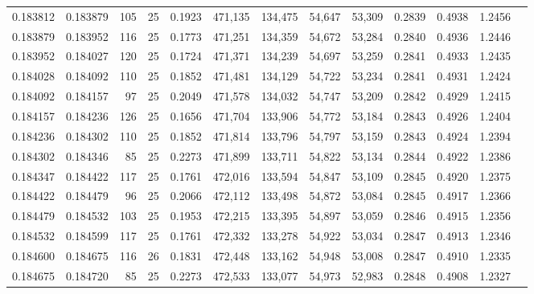 \begin{tabular}{rrrrrrrrrrrrr}
0.183812 & 0.183879 &   105 &  25 &                                     0.1923 & 471,135 & 134,475 &  54,647 &  53,309 & 0.2839 & 0.4938 & 1.2456 \\
0.183879 & 0.183952 &   116 &  25 &                                     0.1773 & 471,251 & 134,359 &  54,672 &  53,284 & 0.2840 & 0.4936 & 1.2446 \\
0.183952 & 0.184027 &   120 &  25 &                                     0.1724 & 471,371 & 134,239 &  54,697 &  53,259 & 0.2841 & 0.4933 & 1.2435 \\
0.184028 & 0.184092 &   110 &  25 &                                     0.1852 & 471,481 & 134,129 &  54,722 &  53,234 & 0.2841 & 0.4931 & 1.2424 \\
0.184092 & 0.184157 &    97 &  25 &                                     0.2049 & 471,578 & 134,032 &  54,747 &  53,209 & 0.2842 & 0.4929 & 1.2415 \\
0.184157 & 0.184236 &   126 &  25 &                                     0.1656 & 471,704 & 133,906 &  54,772 &  53,184 & 0.2843 & 0.4926 & 1.2404 \\
0.184236 & 0.184302 &   110 &  25 &                                     0.1852 & 471,814 & 133,796 &  54,797 &  53,159 & 0.2843 & 0.4924 & 1.2394 \\
0.184302 & 0.184346 &    85 &  25 &                                     0.2273 & 471,899 & 133,711 &  54,822 &  53,134 & 0.2844 & 0.4922 & 1.2386 \\
0.184347 & 0.184422 &   117 &  25 &                                     0.1761 & 472,016 & 133,594 &  54,847 &  53,109 & 0.2845 & 0.4920 & 1.2375 \\
0.184422 & 0.184479 &    96 &  25 &                                     0.2066 & 472,112 & 133,498 &  54,872 &  53,084 & 0.2845 & 0.4917 & 1.2366 \\
0.184479 & 0.184532 &   103 &  25 &                                     0.1953 & 472,215 & 133,395 &  54,897 &  53,059 & 0.2846 & 0.4915 & 1.2356 \\
0.184532 & 0.184599 &   117 &  25 &                                     0.1761 & 472,332 & 133,278 &  54,922 &  53,034 & 0.2847 & 0.4913 & 1.2346 \\
0.184600 & 0.184675 &   116 &  26 &                                     0.1831 & 472,448 & 133,162 &  54,948 &  53,008 & 0.2847 & 0.4910 & 1.2335 \\
0.184675 & 0.184720 &    85 &  25 &                                     0.2273 & 472,533 & 133,077 &  54,973 &  52,983 & 0.2848 & 0.4908 & 1.2327 \\

\end{tabular}
